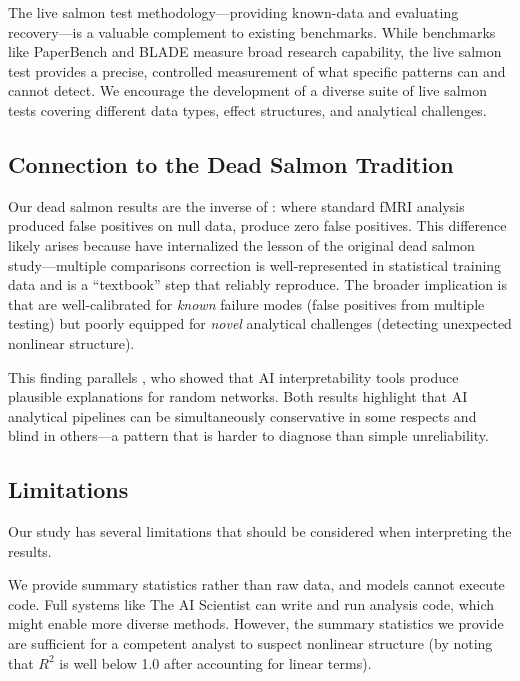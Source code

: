 The live salmon test methodology---providing known-\dgp data and evaluating recovery---is a valuable complement to existing benchmarks.
While benchmarks like PaperBench \citep{starace2025paperbench} and BLADE \citep{gu2024blade} measure broad research capability, the live salmon test provides a precise, controlled measurement of what specific patterns \aiscientists can and cannot detect.
We encourage the development of a diverse suite of live salmon tests covering different data types, effect structures, and analytical challenges.

\subsection{Connection to the Dead Salmon Tradition}
\label{sec:tradition}

Our dead salmon results are the inverse of \citet{bennett2009neural}: where standard fMRI analysis produced false positives on null data, \aiscientists produce zero false positives.
This difference likely arises because \llms have internalized the lesson of the original dead salmon study---multiple comparisons correction is well-represented in statistical training data and is a ``textbook'' step that \llms reliably reproduce.
The broader implication is that \llms are well-calibrated for \textit{known} failure modes (false positives from multiple testing) but poorly equipped for \textit{novel} analytical challenges (detecting unexpected nonlinear structure).

This finding parallels \citet{meloux2025dead}, who showed that AI interpretability tools produce plausible explanations for random networks.
Both results highlight that AI analytical pipelines can be simultaneously conservative in some respects and blind in others---a pattern that is harder to diagnose than simple unreliability.

\subsection{Limitations}
\label{sec:limitations}

Our study has several limitations that should be considered when interpreting the results.

We provide summary statistics rather than raw data, and models cannot execute code.
Full \aiscientist systems like The AI Scientist \citep{lu2024ai} can write and run analysis code, which might enable more diverse methods.
However, the summary statistics we provide are sufficient for a competent analyst to suspect nonlinear structure (\eg by noting that $R^2$ is well below 1.0 after accounting for linear terms).

